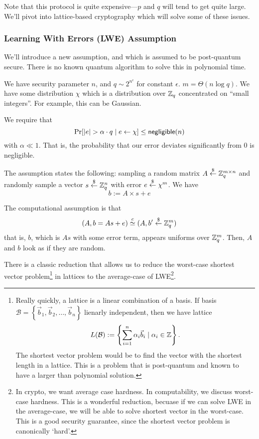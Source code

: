 Note that this protocol is quite expensive---$p$ and $q$ will tend to get quite large. We'll pivot into lattice-based cryptography which will solve some of these issues.

\subsubsection{Learning With Errors (LWE) Assumption}
We'll introduce a new assumption, and which is assumed to be post-quantum secure. There is no known quantum algorithm to solve this in polynomial time.

We have security parameter $n$, and $q\sim 2^{n^\epsilon}$ for constant $\epsilon$. $m = \Theta(n\log q)$. We have some distribution $\chi$ which is a distribution over $\mathbb Z_q$ concentrated on ``small integers''. For example, this can be Gaussian.


We require that
\[\Pr[|e| > \alpha\cdot q \mid e\leftarrow \chi]\leq \operatorname{\mathsf{negligible}}(n)\]
with $\alpha \ll 1$. That is, the probability that our error deviates significantly from $0$ is negligible.

The assumption states the following: sampling a random matrix $A\overset{\$}{\leftarrow} \mathbb Z_q^{m\times n}$ and randomly sample a vector $s\overset{\$}{\leftarrow} \mathbb Z_q^n$ with error $e\overset{\$}{\leftarrow} \chi^m$. We have \[b:=A\times s + e\]

The computational assumption is that
\[(A, b = As+e)\overset{c}{\simeq} (A, b'\overset{\$}{\leftarrow} \mathbb Z_q^m)\]
that is, $b$, which is $As$ with some error term, appears uniforms over $\mathbb Z_q^m$. Then, $A$ and $b$ look as if they are random.

There is a classic reduction that allows us to reduce the worst-case shortest vector problem\footnote{Really quickly, a lattice is a linear combination of a basis. If basis $\mathcal{B} = \left\{ \vec{b}_1, \vec{b}_2, \dots, \vec{b}_n \right\}$ lienarly independent, then we have lattice \[L(\mathcal{B}) := \left\{ \sum^n_{i=1} \alpha_i\vec{b}_i\mid \alpha_i\in \mathbb Z \right\}.\]
The shortest vector problem would be to find the vector with the shortest length in a lattice. This is a problem that is post-quantum and known to have a larger than polynomial solution.} in lattices to the average-case of LWE\footnote{In crypto, we want average case hardness. In computability, we discuss worst-case hardness. This is a wonderful reduction, becuase if we can solve LWE in the average-case, we will be able to solve shortest vector in the worst-case. This is a good security guarantee, since the shortest vector problem is canonically `hard'. }.


